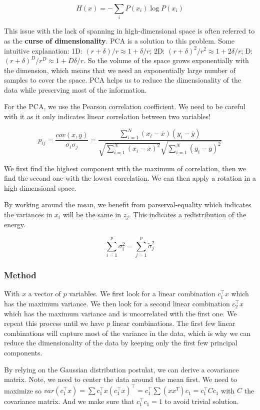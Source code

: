 \documentclass[
  a4paper,
  ,captions=tableheading
]{scrartcl}
\begin{document}
\[
H(x) = -\sum_{i} P(x_i) \log P(x_i)
\]

This issue with the lack of spanning in high-dimensional space is often
referred to as the \textbf{curse of dimensionality}. PCA is a solution
to this problem. Some intuitive explanation: 1D:
\((r+\delta)/r \approx 1 + \delta/r\); 2D:
\((r+\delta)^2/r^2 \approx 1 + 2\delta/r\); D:
\((r+\delta)^D/r^D \approx 1 + D\delta/r\). So the volume of the space
grows exponentially with the dimension, which means that we need an
exponentially large number of samples to cover the space. PCA helps us
to reduce the dimensionality of the data while preserving most of the
information.

For the PCA, we use the Pearson correlation coefficient. We need to be
careful with it as it only indicates linear correlation between two
variables!

\[
p_{ij} = \frac{cov(x,y)}{\sigma_i \sigma_j} = \frac{\sum_{i=1}^N (x_i - \bar{x})(y_i - \bar{y})}{\sqrt{\sum_{i=1}^N (x_i - \bar{x})^2} \sqrt{\sum_{i=1}^N (y_i - \bar{y})^2}}
\]

We first find the highest component with the maximum of correlation,
then we find the second one with the lowest correlation. We can then
apply a rotation in a high dimensional space.

By working around the mean, we benefit from parserval-equality which
indicates the variances in \(x_i\) will be the same in \(z_j\). This
indicates a redistribution of the energy.

\[
\sum_{i=1}^p \sigma_i^2 = \sum_{j=1}^p \tilde{\sigma}_j^2
\]

\subsubsection{Method}\label{method}

With \(x\) a vector of \(p\) variables. We first look for a linear
combination \(c_1^\top x\) which has the maximum variance. We then look
for a second linear combination \(c_2^\top x\) which has the maximum
variance and is uncorrelated with the first one. We repeat this process
until we have \(p\) linear combinations. The first few linear
combinations will capture most of the variance in the data, which is why
we can reduce the dimensionality of the data by keeping only the first
few principal components.

By relying on the Gaussian distribution postulat, we can derive a
covariance matrix. Note, we need to center the data around the mean
first. We need to maximize so
\(var(c_1^\top x) = \sum c_1^\top x (c_1^\top x)^\top =c_1^\top \sum (xx^T) c_1 = c_1^\top C c_1\)
with \(C\) the covariance matrix. And we make sure that
\(c_1^\top c_1 =1\) to avoid trivial solution.
\end{document}
